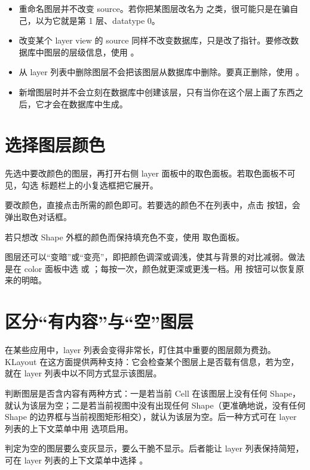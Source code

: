 \begin{itemize}
\item 重命名图层并不改变 source。若你把某图层改名为  之类，很可能只是在骗自己，以为它就是第 1 层、datatype 0。
\item 改变某个 layer view 的 source 同样不改变数据库，只是改了指针。要修改数据库中图层的层级信息，使用 。
\item 从 layer 列表中删除图层不会把该图层从数据库中删除。要真正删除，使用 。
\item 新增图层时并不会立刻在数据库中创建该层，只有当你在这个层上画了东西之后，它才会在数据库中生成。
\end{itemize}

\section{选择图层颜色}\label{sec:layer_color}

先选中要改颜色的图层，再打开右侧 layer 面板中的取色面板。若取色面板不可见，勾选  标题栏上的小复选框把它展开。

要改颜色，直接点击所需的颜色即可。若要选的颜色不在列表中，点击  按钮，会弹出取色对话框。

若只想改 Shape 外框的颜色而保持填充色不变，使用  取色面板。

图层还可以“变暗”或“变亮”，即把颜色调深或调浅，使其与背景的对比减弱。做法是在 color 面板中选  或 ；每按一次，颜色就更深或更浅一档。用  按钮可以恢复原来的明暗。

\section{区分“有内容”与“空”图层}\label{sec:layer_content}

在某些应用中，layer 列表会变得非常长，盯住其中重要的图层颇为费劲。KLayout 在这方面提供两种支持：它会检查某个图层上是否载有信息，若为空，就在 layer 列表中以不同方式显示该图层。

判断图层是否含内容有两种方式：一是若当前 Cell 在该图层上没有任何 Shape，就认为该层为空；二是若当前视图中没有出现任何 Shape（更准确地说，没有任何 Shape 的边界框与当前视图矩形相交），就认为该层为空。后一种方式可在 layer 列表的上下文菜单中用  选项启用。

判定为空的图层要么变灰显示，要么干脆不显示。后者能让 layer 列表保持简短，可在 layer 列表的上下文菜单中选择 。

